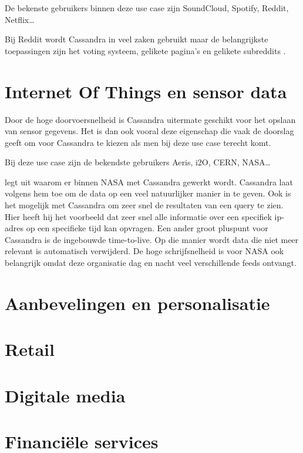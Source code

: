 De bekenste gebruikers binnen deze use case zijn SoundCloud, Spotify, Reddit, Netflix\dots

Bij Reddit wordt Cassandra in veel zaken gebruikt maar de belangrijkste toepassingen zijn  het voting systeem, gelikete pagina's en gelikete subreddits \citep{Harvey2013Reddit}.

\section{Internet Of Things en sensor data}
Door de hoge doorvoersnelheid is Cassandra uitermate geschikt voor het opslaan van sensor gegevens.
Het is dan ook vooral deze eigenschap die vaak de doorslag geeft om voor Cassandra te kiezen als men bij deze use case terecht komt.

Bij deze use case zijn de bekendste gebruikers Aeris, i2O, CERN, NASA\dots

\cite{Keller2013Nasa} legt uit waarom er binnen NASA met Cassandra gewerkt wordt.
Cassandra laat volgens hem toe om de data op een veel natuurlijker manier in te geven.
Ook is het mogelijk met Cassandra om zeer snel de resultaten van een query te zien.
Hier heeft hij het voorbeeld dat zeer snel alle informatie over een specifiek ip-adres op een specifieke tijd kan opvragen.
Een ander groot pluspunt voor Cassandra is de ingebouwde time-to-live.
Op die manier wordt data die niet meer relevant is automatisch verwijderd.
De hoge schrijfsnelheid is voor NASA ook belangrijk omdat deze organisatie dag en nacht veel verschillende feeds ontvangt.

\section{Aanbevelingen en personalisatie}

\section{Retail}

\section{Digitale media}

\section{Financiële services}
